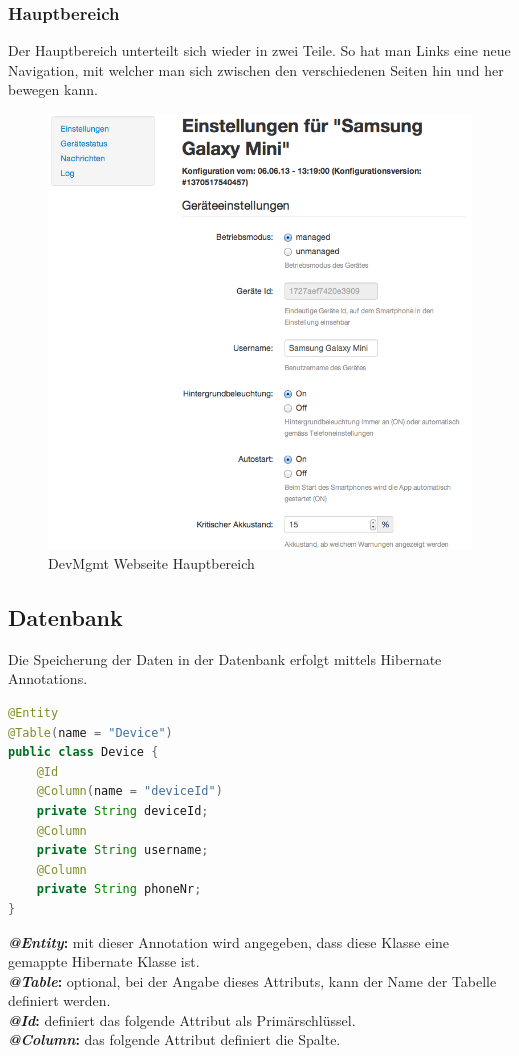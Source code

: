 \subsubsection{Hauptbereich}
Der Hauptbereich unterteilt sich wieder in zwei Teile. So hat man Links eine neue Navigation, mit welcher man sich zwischen den verschiedenen Seiten hin und her bewegen kann. 
 
\begin{figure}[H]
	\centering
	\includegraphics[width=120mm]{images/devmgmtsrv/settings.png}
	\caption{DevMgmt Webseite Hauptbereich}
\end{figure}

\subsection{Datenbank}
Die Speicherung der Daten in der Datenbank erfolgt mittels Hibernate Annotations.

\begin{lstlisting}[language=Java, caption=Hibernate Annotation]
@Entity
@Table(name = "Device")
public class Device {
	@Id
	@Column(name = "deviceId")
	private String deviceId;
	@Column
	private String username;
	@Column
	private String phoneNr;
}
\end{lstlisting}

\textbf{\textit{@Entity}:} mit dieser Annotation wird angegeben, dass diese Klasse eine gemappte Hibernate Klasse ist.\\
\textbf{\textit{@Table}:} optional, bei der Angabe dieses Attributs, kann der Name der Tabelle definiert werden.\\
\textbf{\textit{@Id}:} definiert das folgende Attribut als Primärschlüssel.\\
\textbf{\textit{@Column}:} das folgende Attribut definiert die Spalte.
